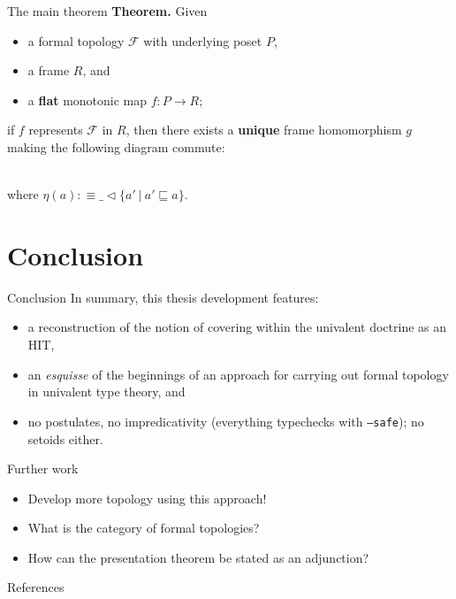 \documentclass[xcolor={dvipsnames}]{beamer}
\newcommand{\fix}[2]{\mathfrak{fix}\left(#1, #2\right)}
\newcommand{\McF}{\mathcal{F}}
\newcommand{\is}{:\equiv}
\newcommand{\covers}[2]{#1 \lhd #2}
\begin{document}
\begin{frame}[fragile]{The main theorem}
  \textbf{Theorem.} Given
  \begin{itemize}
    \item a formal topology $\McF{}$ with underlying poset $P$,
    \item a frame $R$, and
    \item a \textbf{flat} monotonic map $f : P \rightarrow R$;
  \end{itemize}
  \begin{center}
    if $f$ represents $\McF{}$ in $R$, then there exists a \textbf{unique} frame
    homomorphism $g$ making the following diagram commute:
  \end{center}

  \begin{center}
    \\
    \vspace{0.5em}
    {\footnotesize where $\eta(a) \is \covers{\_}{ \{ a' ~|~ a' \sqsubseteq a \} }$.}
  \end{center}
\end{frame}

\section{Conclusion}

\begin{frame}[noframenumbering]{Conclusion}
  In summary, this thesis development features:
  \begin{itemize}
    \item a reconstruction of the notion of covering within the univalent doctrine as an
      HIT,
    \item an \emph{esquisse} of the beginnings of an approach for carrying out formal
      topology in univalent type theory, and
    \item no postulates, no impredicativity (everything typechecks with
      {\small \texttt{--safe}}); no setoids either.
  \end{itemize}
\end{frame}

\begin{frame}[noframenumbering]{Further work}
  \begin{itemize}
    \item Develop more topology using this approach!
    \item What is the category of formal topologies?
    \item How can the presentation theorem be stated as an adjunction?
  \end{itemize}
\end{frame}

\begin{frame}[noframenumbering]{References}
  \printbibliography[heading=none]
\end{frame}
\end{document}
